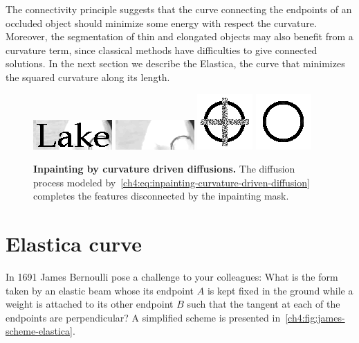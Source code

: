 The connectivity principle suggests that the curve connecting the endpoints of an occluded object should minimize some energy with respect the curvature. Moreover, the segmentation of thin and elongated objects may also benefit from a curvature term, since classical methods have difficulties to give connected solutions. In the next section we describe the Elastica, the curve that minimizes the squared curvature along its length.

\begin{figure}
\center
\includegraphics[scale=1]{figures/chapter4/inpainting-cdd/lake-1.png}\hspace{0.5em}
\includegraphics[scale=1]{figures/chapter4/inpainting-cdd/lake-2.png}\hspace{3em}
\includegraphics[scale=0.6]{figures/chapter4/inpainting-cdd/circle-1.png}\hspace{0.5em}
\includegraphics[scale=0.6]{figures/chapter4/inpainting-cdd/circle-2.png}
\caption{\textbf{Inpainting by curvature driven diffusions.}\cite{chan01nontexture} The diffusion process modeled by~\cref{ch4:eq:inpainting-curvature-driven-diffusion} completes the features disconnected by the inpainting mask.}
\label{ch4:fig:inpainting-curvature-driven-diffusion}
\end{figure}



\section{Elastica curve}
\label{ch4:sec:elastica-curve}

In 1691 James Bernoulli pose a challenge to your colleagues: What is the form taken by an elastic beam whose its endpoint $A$ is kept fixed in the ground while a weight is attached to its other endpoint $B$ such that the tangent at each of the endpoints are perpendicular? A simplified scheme is presented in~\cref{ch4:fig:james-scheme-elastica}.

